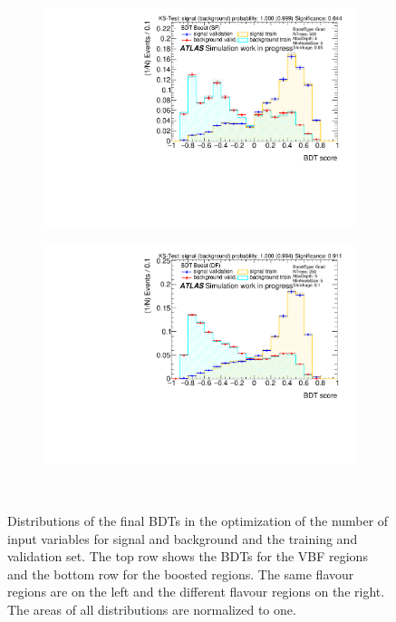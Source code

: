 \begin{figure}[htbp]
\begin{subfigure}[t]{0.49\textwidth}
        \includegraphics[width=\textwidth]{./plots/mva/variable_reduction/BOOST_SF_bdt_output_clean.pdf}
    \end{subfigure}
    \begin{subfigure}[t]{0.49\textwidth}
        \includegraphics[width=\textwidth]{./plots/mva/variable_reduction/BOOST_DF_bdt_output_clean.pdf}
    \end{subfigure}
    \caption{Distributions of the final BDTs in the optimization of the number of input variables for signal and background and the training and validation set.
             The top row shows the BDTs for the VBF regions and the bottom row for the boosted regions.
             The same flavour regions are on the left and the different flavour regions on the right.
             The areas of all distributions are normalized to one.}~\label{fig:mva:varopt:bdts}
\end{figure}


